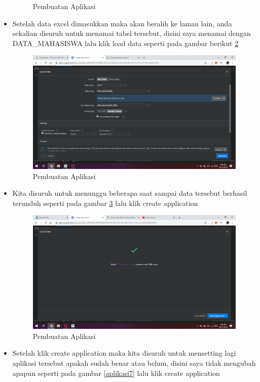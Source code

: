 \documentclass[12pt, times new roman, a4paper]{article}
\begin{document}
\begin{itemize}
\begin{figure}[!htbp]
        \caption{Pembuatan Aplikasi}
        \label{aplikasi4}
    \end{figure}
    \item Setelah data excel dimasukkan maka akan beralih ke laman lain, anda sekalian disuruh untuk menamai tabel tersebut, disini saya menamai dengan DATA\_MAHASISWA lalu klik load data seperti pada gambar berikut \ref{aplikasi5}
    \begin{figure}[!htbp]
        \centering
        \includegraphics[scale=0.21]{figures/aplikasi5.png}
        \caption{Pembuatan Aplikasi}
        \label{aplikasi5}
    \end{figure}
    \item Kita disuruh untuk menunggu beberapa saat sampai data tersebut berhasil terunduh seperti pada gambar \ref{aplikasi6} lalu klik create application
    \begin{figure}[!htbp]
        \centering
        \includegraphics[scale=0.21]{figures/aplikasi6.png}
        \caption{Pembuatan Aplikasi}
        \label{aplikasi6}
    \end{figure}
    \item Setelah klik create application maka kita disuruh untuk mensetting lagi aplikasi tersebut apakah sudah benar atau belum, disini saya tidak mengubah apapun seperti pada gambar \ref{aplikasi7} lalu klik create application

\end{itemize}
\end{document}
